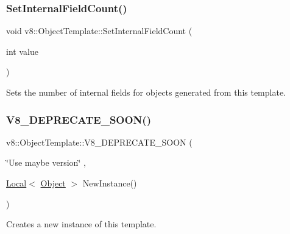 \subsubsection{\texorpdfstring{Set\+Internal\+Field\+Count()}{SetInternalFieldCount()}}
{\footnotesize\ttfamily void v8\+::\+Object\+Template\+::\+Set\+Internal\+Field\+Count (\begin{DoxyParamCaption}\item[{int}]{value }\end{DoxyParamCaption})}

Sets the number of internal fields for objects generated from this template. \mbox{\label{classv8_1_1ObjectTemplate_abfa44addb7c9b426036a34bc7e60cc20}} 
\subsubsection{\texorpdfstring{V8\+\_\+\+D\+E\+P\+R\+E\+C\+A\+T\+E\+\_\+\+S\+O\+O\+N()}{V8\_DEPRECATE\_SOON()}}
{\footnotesize\ttfamily v8\+::\+Object\+Template\+::\+V8\+\_\+\+D\+E\+P\+R\+E\+C\+A\+T\+E\+\_\+\+S\+O\+ON (\begin{DoxyParamCaption}\item[{\char`\"{}Use maybe version\char`\"{}}]{,  }\item[{\mbox{\hyperlink{classv8_1_1Local}{Local}}$<$ \mbox{\hyperlink{classv8_1_1Object}{Object}} $>$ }]{New\+Instance() }\end{DoxyParamCaption})}

Creates a new instance of this template. \mbox{\label{classv8_1_1ObjectTemplate_acf39e693ef3304f5f2a8a0e6afd106e9}} 
